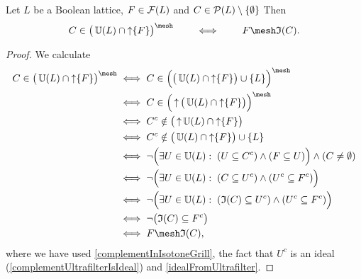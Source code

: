 \begin{lemma} \label{compactnessEquivalentsLemma}
Let $L$ be a Boolean lattice, $F\in \operatorname{\mathcal{F}}(L)$ and $C\in \operatorname{\mathcal{P}}(L)\setminus\{\emptyset\}$ Then
\[ C\in \big(\ultrafilters(L) \cap \upset \{F\}\big)^\mesh \qquad\iff\qquad F \mesh \mathfrak{I}(C). \]
\end{lemma}
\begin{proof}
We calculate
\begin{align*}
C\in \big(\ultrafilters(L) \cap \upset \{F\}\big)^\mesh &\iff C\in \Big(\big(\ultrafilters(L) \cap \upset \{F\}\big)\cup\{L\}\Big)^\mesh \\
&\iff C\in \Big(\upset\big(\ultrafilters(L) \cap \upset \{F\}\big)\Big)^\mesh \\
&\iff C^c \notin \big(\upset \ultrafilters(L) \cap \upset \{F\}\big) \\
&\iff C^c \notin \big(\ultrafilters(L) \cap \upset \{F\}\big)\cup \{L\} \\
&\iff \neg \Big(\exists U\in \ultrafilters(L): \; (U\subseteq C^c) \land (F \subseteq U)\Big) \land (C\neq \emptyset) \\
&\iff \neg \Big(\exists U\in \ultrafilters(L): \; (C\subseteq U^c) \land (U^c \subseteq F^c)\Big) \\
&\iff \neg \Big(\exists U\in \ultrafilters(L): \; (\mathfrak{I}(C)\subseteq U^c) \land (U^c \subseteq F^c)\Big) \\
&\iff \neg \big(\mathfrak{I}(C) \subseteq F^c\big) \\
&\iff F \mesh \mathfrak{I}(C),
\end{align*}
where we have used \ref{complementInIsotoneGrill}, the fact that $U^c$ is an ideal (\ref{complementUltrafilterIsIdeal}) and \ref{idealFromUltrafilter}.
\end{proof}

